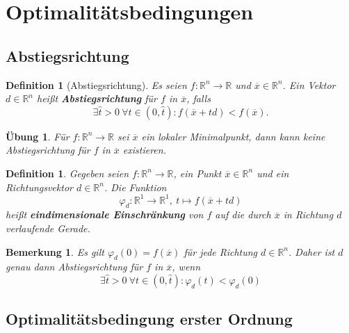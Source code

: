 \documentclass[11pt]{scrreprt}
\newcounter{thm}
\theoremstyle{thmstyle}
\numberwithin{thm}{section}
\newtheorem{definition}[thm]{Definition}
\newtheorem{uebung}[thm]{Übung}
\newtheorem*{bemerkung*}{Bemerkung}
\begin{document}
\setcounter{chapter}{2}
\setcounter{section}{1}

\newpage

\section*{Optimalitätsbedingungen}

\subsection*{Abstiegsrichtung}

\setcounter{thm}{0}

\begin{definition}[Abstiegsrichtung]
	Es seien $f \colon \mathbb{R}^n \rightarrow \mathbb{R}$ und $\overline{x} \in \mathbb{R}^n$. Ein Vektor $d \in \mathbb{R}^n$ heißt \textbf{Abstiegsrichtung} für $f$ in $\overline{x}$, falls
	$$ \exists \hat{t} > 0 ~\forall t \in (0, \hat{t}) \colon f(\overline{x} + td) < f(\overline{x}). $$
\end{definition}

\begin{uebung}
	Für $f \colon \mathbb{R}^n \rightarrow \mathbb{R}$ sei $\overline{x}$ ein lokaler Minimalpunkt, dann kann keine Abstiegsrichtung für $f$ in $\overline{x}$ existieren.
\end{uebung}

\begin{definition}
	Gegeben seien $f \colon \mathbb{R}^n \rightarrow \mathbb{R}$, ein Punkt $\overline{x} \in \mathbb{R}^n$ und ein Richtungsvektor $d \in \mathbb{R}^n$. Die Funktion
	$$ \varphi_d \colon \mathbb{R}^1 \rightarrow
	 \mathbb{R}^1, ~ t \mapsto f(\overline{x} + td) $$
	 heißt \textbf{eindimensionale Einschränkung} von $f$ auf die durch $\overline{x}$ in Richtung $d$ verlaufende Gerade.
\end{definition}

\begin{bemerkung*}
		Es gilt $\varphi_d(0) = f(\overline{x})$ für jede Richtung $d \in \mathbb{R}^n$. Daher ist $d$ genau dann Abstiegsrichtung für $f$ in $\overline{x}$, wenn
		$$ \exists \hat{t} > 0 ~\forall t \in (0, \hat{t}) \colon \varphi_d(t) < \varphi_d(0) $$
\end{bemerkung*}

\subsection*{Optimalitätsbedingung erster Ordnung}
\end{document}
